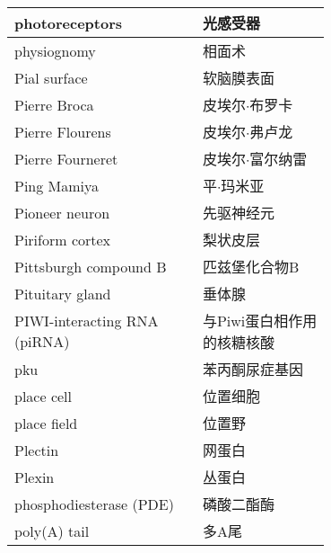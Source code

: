 \begin{longtable}{lll}
	\midrule
	photoreceptors     && 光感受器   \\
	
	\midrule
	physiognomy     && 相面术   \\
	
	\midrule
	Pial surface     && 软脑膜表面   \\
	
	\midrule
	Pierre Broca     && 皮埃尔$\cdot$布罗卡   \\
	
	\midrule
	Pierre Flourens     && 皮埃尔$\cdot$弗卢龙   \\
	
	\midrule
	Pierre Fourneret     && 皮埃尔$\cdot$富尔纳雷   \\
	
	\midrule
	Ping Mamiya     && 平$\cdot$玛米亚   \\
	
	\midrule
	Pioneer neuron     && 先驱神经元   \\
	
	\midrule
	Piriform cortex     && 梨状皮层   \\
	
	\midrule
	Pittsburgh compound B     && 匹兹堡化合物B   \\
	
	\midrule
	Pituitary gland     && 垂体腺   \\
	
	\midrule
	\makecell[l]{PIWI-interacting RNA \\ (piRNA) }  && \makecell[l]{与Piwi蛋白相作用\\的核糖核酸}   \\
	
	\midrule
	pku   && 苯丙酮尿症基因   \\
	
	\midrule
	place cell   && 位置细胞   \\
	
	\midrule
	place field   && 位置野   \\
	
	\midrule
	Plectin   && 网蛋白   \\
	
	\midrule
	Plexin   && 丛蛋白   \\
	
	\midrule
	phosphodiesterase (PDE)  && 磷酸二酯酶   \\
	
	\midrule
	poly(A) tail  && 多A尾   \\
	

\end{longtable}
